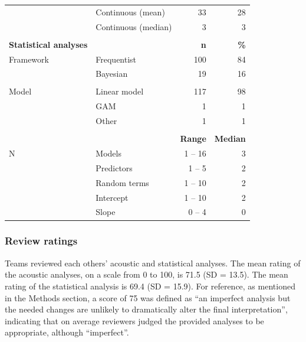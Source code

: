 \documentclass[Review,times,sageh]{sagej}
\begin{document}
\begin{table}
{\begin{tabular}[t]{llrr}
 & Continuous (mean) & 33 & 28\\
 & Continuous (median) & 3 & 3\\
 &  &  \vphantom{2} & \\
\bf{Statistical analyses} &  & \bf{n} & \bf{\%}\\
\midrule
\hspace{1em}Framework & Frequentist & 100 & 84\\
 & Bayesian & 19 & 16\\
 &  &  \vphantom{1} & \\
\hspace{1em}Model & Linear model & 117 & 98\\
 & GAM & 1 & 1\\
 & Other & 1 & 1\\
 &  &  & \\
 &  & \bf{Range} & \bf{Median}\\
\hspace{1em}N & Models & 1 -- 16 & 3\\
 & Predictors & 1 -- 5 & 2\\
 & Random terms & 1 -- 10 & 2\\
\hspace{1em} & \hspace{1em}Intercept & \hspace{1em}1 -- 10 & \hspace{1em}2\\
\hspace{1em} & \hspace{1em}Slope & \hspace{1em}0 -- 4 & \hspace{1em}0\\
\bottomrule
\end{tabular}}
\end{table}

\hypertarget{review-ratings}{%
\subsubsection{Review ratings}\label{review-ratings}}

Teams reviewed each others' acoustic and statistical analyses.
The mean rating of the acoustic analyses, on a scale from 0 to 100, is 71.5 (SD = 13.5).
The mean rating of the statistical analysis is 69.4 (SD = 15.9).
For reference, as mentioned in the Methods section, a score of 75 was defined as ``an imperfect analysis but the needed changes are unlikely to dramatically alter the final interpretation'', indicating that on average reviewers judged the provided analyses to be appropriate, although ``imperfect''.
\end{document}
